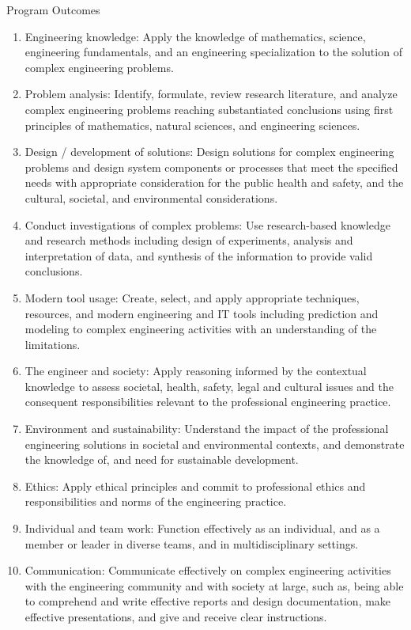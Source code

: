 \documentclass[11pt]{report}
\begin{document}
\begin{center}
Program Outcomes
\end{center}

\begin{enumerate}
\item Engineering knowledge: Apply the knowledge of mathematics, science, engineering fundamentals, and an engineering specialization to the solution of complex engineering problems. 
\item Problem analysis: Identify, formulate, review research literature, and analyze complex engineering problems reaching substantiated conclusions using first principles of mathematics, natural sciences, and engineering sciences. 
\item Design / development of solutions: Design solutions for complex engineering problems and design system components or processes that meet the specified needs with appropriate consideration for the public health and safety, and the cultural, societal, and environmental considerations. 
\item Conduct investigations of complex problems: Use research-based knowledge and research methods including design of experiments, analysis and interpretation of data, and synthesis of the information to provide valid conclusions. 
\item Modern tool usage: Create, select, and apply appropriate techniques, resources, and modern engineering and IT tools including prediction and modeling to complex engineering activities with an understanding of the limitations. 
\item The engineer and society: Apply reasoning informed by the contextual knowledge to assess societal, health, safety, legal and cultural issues and the consequent responsibilities relevant to the professional engineering practice. 
\item Environment and sustainability: Understand the impact of the professional engineering solutions in societal and environmental contexts, and demonstrate the knowledge of, and need for sustainable development. 
\item Ethics: Apply ethical principles and commit to professional ethics and responsibilities and norms of the engineering practice.
\item Individual and team work: Function effectively as an individual, and as a member or leader in diverse teams, and in multidisciplinary settings. 
\item Communication: Communicate effectively on complex engineering activities with the engineering community and with society at large, such as, being able to comprehend and write effective reports and design documentation, make effective presentations, and give and receive clear instructions. 

\end{enumerate}
\end{document}
